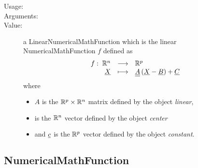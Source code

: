 \begin{description}

\item[Usage:]   \rule{0pt}{1em}

\item[Arguments:]  \rule{0pt}{1em}


\item[Value:] a LinearNumericalMathFunction which is the linear
NumericalMathFunction $f$ defined as
\begin{align*}
\begin{array}{rcl}
f: \; {\mathbb R}^n & \longrightarrow & {\mathbb R}^p\\
{\underline{X}} & \longmapsto & {\underline{\underline{A}}} \, ({\underline{X}} - {\underline{B}}) + {\underline{C}}
\end{array}
\end{align*}
where
\begin{itemize}
\item $A$ is the ${\mathbb R}^p \times {\mathbb R}^n$ matrix defined by the object \textit{linear},
\item \textit{} is the ${\mathbb R}^n$ vector defined by the object \textit{center}
\item and ${\underline{c}}$ is the ${\mathbb R}^p$ vector defined by the object \textit{constant}.
\end{itemize}

\end{description}

\newpage
\subsection{NumericalMathFunction}


